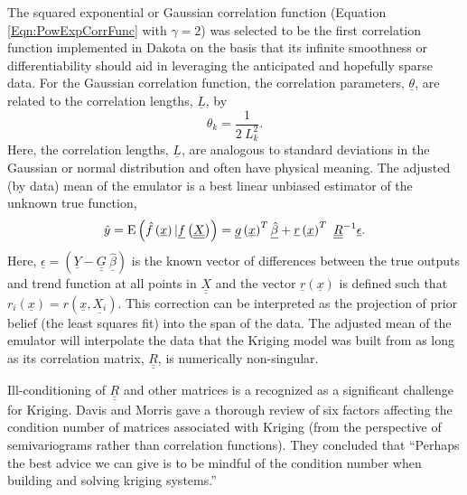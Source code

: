 The squared exponential or Gaussian correlation function (Equation 
\ref{Eqn:PowExpCorrFunc} with $\gamma=2$) was selected to be the 
first correlation function implemented in Dakota on the basis that 
its infinite smoothness or differentiability should aid in leveraging 
the anticipated and hopefully sparse data.
For the Gaussian correlation function, the correlation parameters, 
$\underline{\theta}$, are related to the correlation lengths, 
$\underline{L}$, by
\begin{equation}
\theta_k=\frac{1}{2\ L_k^2}.
\end{equation}
Here, the correlation lengths, $\underline{L}$, are analogous to 
standard deviations in the Gaussian or normal distribution and often 
have physical meaning. The adjusted (by data) mean of the emulator is 
a best linear unbiased estimator of the unknown true function,
\begin{equation}
\hat{y}={\rm E}\left(\hat{f}\left(\underline{x}\right)|\underline{f}\left(\underline{\underline{X}}\right)\right)=\underline{g}\left(\underline{x}\right)^T\underline{\hat{\beta}}+\underline{r}\left(\underline{x}\right)^T\ \underline{\underline{R}}^{-1}\underline{\epsilon}.
\label{Eq:KrigMean}
\end{equation}
Here, $\underline{\epsilon}=\left(\underline{Y}-\underline{\underline{G}}\ \underline{\hat{\beta}}\right)$ 
is the known vector of differences between the true outputs and trend 
function at all points in $\underline{\underline{X}}$ and the vector 
$\underline{r}\left(\underline{x}\right)$ is defined such that
$r_i\left(\underline{x}\right)=r\left(\underline{x},\underline{X_i}\right)$.  
This correction can be interpreted as the projection of prior belief 
(the least squares fit) into the span of the data. The adjusted mean 
of the emulator will interpolate the data that the Kriging model was 
built from as long as its correlation matrix, $\underline{\underline{R}}$, 
is numerically non-singular.\newline

Ill-conditioning of $\underline{\underline{R}}$ and other matrices
is a recognized as a significant challenge for Kriging. Davis and 
Morris \cite{Dav97} gave a thorough review of six factors 
affecting the condition number of matrices associated with Kriging
(from the perspective of semivariograms rather than correlation 
functions).  They concluded that 
``Perhaps the best advice we can give is to be mindful of the 
condition number when building and solving kriging systems.''\newline


